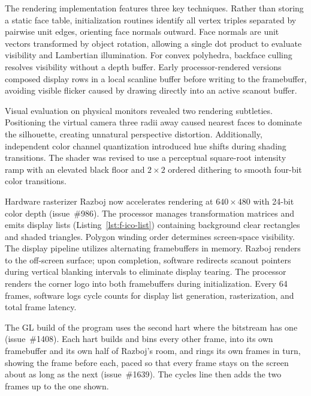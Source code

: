 \documentclass[journal,9pt]{IEEEtran}
\begin{document}
The rendering implementation features three key techniques. Rather than storing
a static face table, initialization routines identify all vertex triples
separated by pairwise unit edges, orienting face normals outward. Face normals
are unit vectors transformed by object rotation, allowing a single dot product
to evaluate visibility and Lambertian illumination. For convex polyhedra,
backface culling resolves visibility without a depth buffer. Early
processor-rendered versions composed display rows in a local scanline buffer
before writing to the framebuffer, avoiding visible flicker caused by drawing
directly into an active scanout buffer.

Visual evaluation on physical monitors revealed two rendering subtleties.
Positioning the virtual camera three radii away caused nearest faces to dominate
the silhouette, creating unnatural perspective distortion. Additionally,
independent color channel quantization introduced hue shifts during shading
transitions. The shader was revised to use a perceptual square-root intensity
ramp with an elevated black floor and $2\times2$ ordered dithering to smooth
four-bit color transitions.

Hardware rasterizer Razboj now accelerates rendering at $640\times480$ with
24-bit color depth (issue~\#986). The processor manages transformation matrices
and emits display lists (Listing~\ref{lst:f-ico-list}) containing background
clear rectangles and shaded triangles. Polygon winding order determines
screen-space visibility. The display pipeline utilizes alternating framebuffers
in memory. Razboj renders to the off-screen surface; upon completion, software
redirects scanout pointers during vertical blanking intervals to eliminate
display tearing. The processor renders the corner logo into both framebuffers
during initialization. Every 64 frames, software logs cycle counts for display
list generation, rasterization, and total frame latency.

The GL build of the program uses the second hart where the bitstream has one
(issue~\#1408). Each hart builds and bins every other frame, into its own
framebuffer and its own half of Razboj's room, and rings its own frames in
turn, showing the frame before each, paced so that every frame stays on the
screen about as long as the next (issue~\#1639). The cycles line then adds the
two frames up to the one shown.


\end{document}
